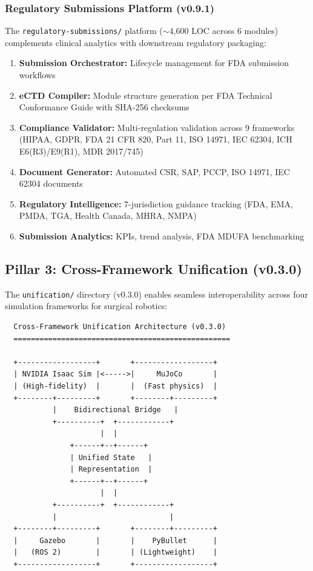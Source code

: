 \documentclass[10pt]{article}
\begin{document}
\subsubsection{Regulatory Submissions Platform (v0.9.1)}

The \texttt{regulatory-submissions/} platform ($\sim$4,600 LOC across 6 modules) complements clinical analytics with downstream regulatory packaging:

\begin{enumerate}
  \item \textbf{Submission Orchestrator:} Lifecycle management for FDA submission workflows
  \item \textbf{eCTD Compiler:} Module structure generation per FDA Technical Conformance Guide with SHA-256 checksums
  \item \textbf{Compliance Validator:} Multi-regulation validation across 9 frameworks (HIPAA, GDPR, FDA 21 CFR 820, Part 11, ISO 14971, IEC 62304, ICH E6(R3)/E9(R1), MDR 2017/745)
  \item \textbf{Document Generator:} Automated CSR, SAP, PCCP, ISO 14971, IEC 62304 documents
  \item \textbf{Regulatory Intelligence:} 7-jurisdiction guidance tracking (FDA, EMA, PMDA, TGA, Health Canada, MHRA, NMPA)
  \item \textbf{Submission Analytics:} KPIs, trend analysis, FDA MDUFA benchmarking
\end{enumerate}

\subsection{Pillar 3: Cross-Framework Unification (v0.3.0)}
\label{sec:unification}

The \texttt{unification/} directory (v0.3.0) enables seamless interoperability across four simulation frameworks for surgical robotics:

\begin{verbatim}
  Cross-Framework Unification Architecture (v0.3.0)
  ==================================================

  +------------------+       +------------------+
  | NVIDIA Isaac Sim |<----->|     MuJoCo       |
  | (High-fidelity)  |       |  (Fast physics)  |
  +--------+---------+       +--------+---------+
           |    Bidirectional Bridge   |
           +----------+  +------------+
                      |  |
               +------+--+------+
               | Unified State   |
               | Representation  |
               +------+--+------+
                      |  |
           +----------+  +------------+
           |                          |
  +--------+---------+       +--------+---------+
  |     Gazebo       |       |    PyBullet      |
  |   (ROS 2)        |       | (Lightweight)    |
  +------------------+       +------------------+
\end{verbatim}
\end{document}
